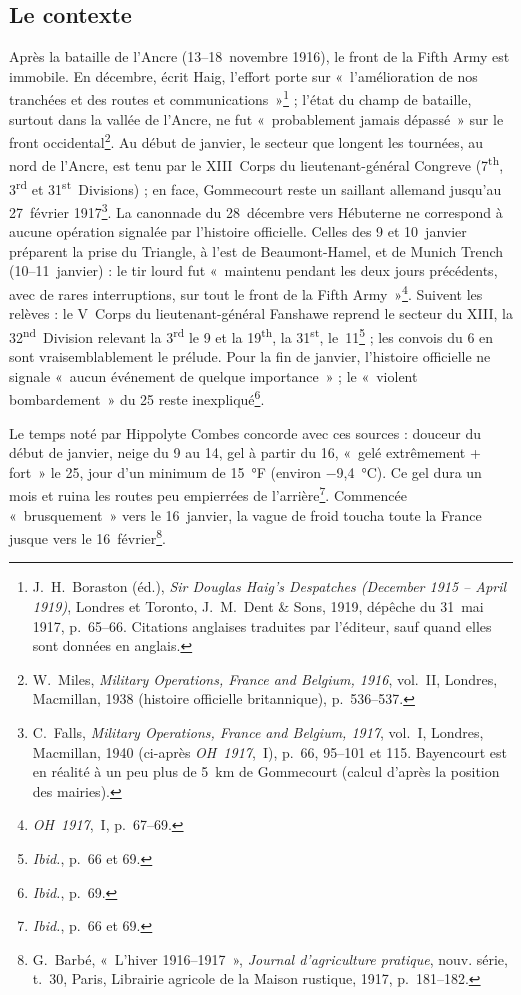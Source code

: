 \subsection*{Le contexte}

Après la bataille de l'Ancre (13--18~novembre 1916), le front de la Fifth Army est immobile. En décembre, écrit Haig, l'effort porte sur «~l'amélioration de nos tranchées et des routes et communications~»\footnote{J.~H.~Boraston (éd.), \textit{Sir Douglas Haig's Despatches (December 1915 -- April 1919)}, Londres et Toronto, J.~M.~Dent \& Sons, 1919, dépêche du 31~mai 1917, p.~65--66. Citations anglaises traduites par l'éditeur, sauf quand elles sont données en anglais.} ; l'état du champ de bataille, surtout dans la vallée de l'Ancre, ne fut «~probablement jamais dépassé~» sur le front occidental\footnote{W.~Miles, \textit{Military Operations, France and Belgium, 1916}, vol.~II, Londres, Macmillan, 1938 (histoire officielle britannique), p.~536--537.}. Au début de janvier, le secteur que longent les tournées, au nord de l'Ancre, est tenu par le XIII~Corps du lieutenant-général Congreve (7\textsuperscript{th}, 3\textsuperscript{rd} et 31\textsuperscript{st}~Divisions) ; en face, Gommecourt reste un saillant allemand jusqu'au 27~février 1917\footnote{C.~Falls, \textit{Military Operations, France and Belgium, 1917}, vol.~I, Londres, Macmillan, 1940 (ci-après \textit{OH~1917},~I), p.~66, 95--101 et 115. Bayencourt est en réalité à un peu plus de 5~km de Gommecourt (calcul d'après la position des mairies).}. La canonnade du 28~décembre vers Hébuterne ne correspond à aucune opération signalée par l'histoire officielle. Celles des 9 et 10~janvier préparent la prise du Triangle, à l'est de Beaumont-Hamel, et de Munich Trench (10--11~janvier) : le tir lourd fut «~maintenu pendant les deux jours précédents, avec de rares interruptions, sur tout le front de la Fifth Army~»\footnote{\textit{OH~1917},~I, p.~67--69.}. Suivent les relèves : le V~Corps du lieutenant-général Fanshawe reprend le secteur du XIII, la 32\textsuperscript{nd}~Division relevant la 3\textsuperscript{rd} le 9 et la 19\textsuperscript{th}, la 31\textsuperscript{st}, le~11\footnote{\textit{Ibid.}, p.~66 et 69.} ; les convois du 6 en sont vraisemblablement le prélude. Pour la fin de janvier, l'histoire officielle ne signale «~aucun événement de quelque importance~» ; le «~violent bombardement~» du 25 reste inexpliqué\footnote{\textit{Ibid.}, p.~69.}.

Le temps noté par Hippolyte Combes concorde avec ces sources : douceur du début de janvier, neige du 9 au 14, gel à partir du 16, «~gelé extrêmement + fort~» le 25, jour d'un minimum de 15~°F (environ −9,4~°C). Ce gel dura un mois et ruina les routes peu empierrées de l'arrière\footnote{\textit{Ibid.}, p.~66 et 69.}. Commencée «~brusquement~» vers le 16~janvier, la vague de froid toucha toute la France jusque vers le 16~février\footnote{G.~Barbé, «~L'hiver 1916--1917~», \textit{Journal d'agriculture pratique}, nouv. série, t.~30, Paris, Librairie agricole de la Maison rustique, 1917, p.~181--182.}.

